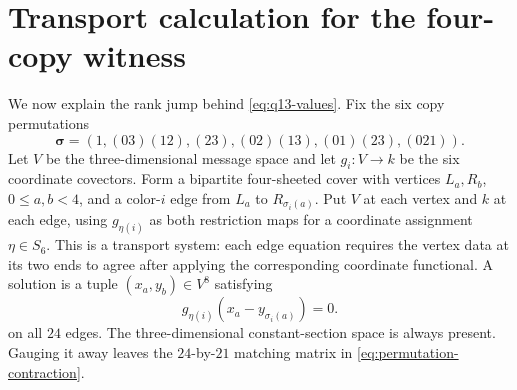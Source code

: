 \section{Transport calculation for the four-copy witness}\label{sec:transport}

We now explain the rank jump behind \eqref{eq:q13-values}.  Fix the six copy
permutations
\[
\boldsymbol\sigma=(1,(03)(12),(23),(02)(13),(01)(23),(021)).
\]
Let \(V\) be the three-dimensional message space and let
\(g_i:V\to k\) be the six coordinate covectors.  Form a bipartite
four-sheeted cover with vertices \(L_a,R_b\), \(0\leq a,b<4\), and a
color-\(i\) edge from \(L_a\) to \(R_{\sigma_i(a)}\).  Put \(V\) at each
vertex and \(k\) at each edge, using \(g_{\eta(i)}\) as both restriction
maps for a coordinate assignment \(\eta\in S_6\).  This is a transport
system: each edge equation requires the vertex data at its two ends to agree
after applying the corresponding coordinate functional.  A solution is a tuple
\((x_a,y_b)\in V^8\) satisfying
\begin{equation}\label{eq:transport-section}
 g_{\eta(i)}(x_a-y_{\sigma_i(a)})=0 .
\end{equation}
on all \(24\) edges.  The three-dimensional constant-section space is
always present.  Gauging it away leaves the \(24\)-by-\(21\) matching
matrix in \eqref{eq:permutation-contraction}.

